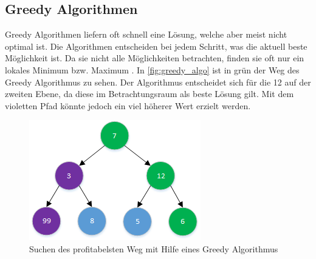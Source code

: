 \subsection{Greedy Algorithmen}\label{greedy_algos}
Greedy Algorithmen liefern oft schnell eine Lösung, welche aber meist nicht optimal ist. Die Algorithmen entscheiden bei jedem Schritt, was die aktuell beste Möglichkeit ist. Da sie nicht alle 
Möglichkeiten betrachten, finden sie oft nur ein lokales Minimum bzw. Maximum \cite{mcmillan2014data}. In \autoref{fig:greedy_algo} ist in grün der Weg des Greedy Algorithmus zu sehen. 
Der Algorithmus entscheidet sich für die 12 auf der zweiten Ebene, da diese im Betrachtungsraum als beste Lösung gilt. Mit dem violetten Pfad könnte jedoch ein viel höherer Wert erzielt 
werden.

\begin{figure}[h]
\centering 
\includegraphics[scale=1]{images/einleitung/greedy_algo.png}
\caption[Suchen des profitabelsten Weg mit Hilfe eines Greedy Algorithmus]{Suchen des profitabelsten Weg mit Hilfe eines Greedy Algorithmus }
\label{fig:greedy_algo}
\end{figure}

\FloatBarrier

